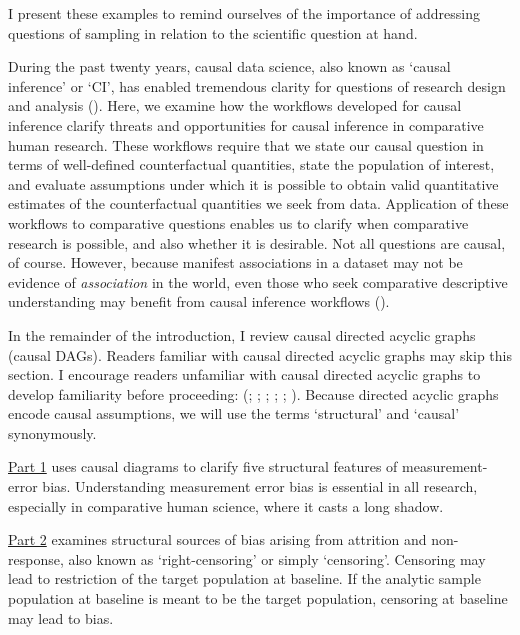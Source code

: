 \documentclass[
  single column]{article}
\begin{document}
I present these examples to remind ourselves of the importance of
addressing questions of sampling in relation to the scientific question
at hand.

During the past twenty years, causal data science, also known as `causal
inference' or `CI', has enabled tremendous clarity for questions of
research design and analysis
().
Here, we examine how the workflows developed for causal inference
clarify threats and opportunities for causal inference in comparative
human research. These workflows require that we state our causal
question in terms of well-defined counterfactual quantities, state the
population of interest, and evaluate assumptions under which it is
possible to obtain valid quantitative estimates of the counterfactual
quantities we seek from data. Application of these workflows to
comparative questions enables us to clarify when comparative research is
possible, and also whether it is desirable. Not all questions are
causal, of course. However, because manifest associations in a dataset
may not be evidence of \emph{association} in the world, even those who
seek comparative descriptive understanding may benefit from causal
inference workflows ().

In the remainder of the introduction, I review causal directed acyclic
graphs (causal DAGs). Readers familiar with causal directed acyclic
graphs may skip this section. I encourage readers unfamiliar with causal
directed acyclic graphs to develop familiarity before proceeding:
(;
;
;
;
;
). Because directed acyclic graphs
encode causal assumptions, we will use the terms `structural' and
`causal' synonymously.

\hyperref[id-sec-1]{Part 1} uses causal diagrams to clarify five
structural features of measurement-error bias. Understanding measurement
error bias is essential in all research, especially in comparative human
science, where it casts a long shadow.

\hyperref[id-sec-2]{Part 2} examines structural sources of bias arising
from attrition and non-response, also known as `right-censoring' or
simply `censoring'. Censoring may lead to restriction of the target
population at baseline. If the analytic sample population at baseline is
meant to be the target population, censoring at baseline may lead to
bias.
\end{document}
